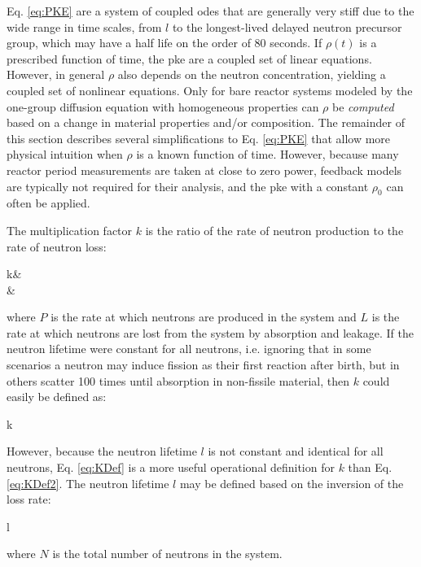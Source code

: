 Eq. \eqref{eq:PKE} are a system of coupled \glspl{ode} that are generally very stiff due to the wide range in time scales, from \(l\) to the longest-lived delayed neutron precursor group, which may have a half life on the order of 80 seconds. If \(\rho(t)\) is a prescribed function of time, the \gls{pke} are a coupled set of linear equations. However, in general \(\rho\) also depends on the neutron concentration, yielding a coupled set of nonlinear equations. Only for bare reactor systems modeled by the one-group diffusion equation with homogeneous properties can \(\rho\) be {\it computed} based on a change in material properties and/or composition. The remainder of this section describes several simplifications to Eq. \eqref{eq:PKE} that allow more physical intuition when \(\rho\) is a known function of time. However, because many reactor period measurements are taken at close to zero power, feedback models are typically not required for their analysis, and the \gls{pke} with a constant \(\rho_0\) can often be applied.

The multiplication factor \(k\) is the ratio of the rate of neutron production to the rate of neutron loss:

\beqa
\label{eq:KDef}
k\equiv&\\
\equiv&
\eeqa

where \(P\) is the rate at which neutrons are produced in the system and \(L\) is the rate at which neutrons are lost from the system by absorption and leakage. If the neutron lifetime were constant for all neutrons, i.e. ignoring that in some scenarios a neutron may induce fission as their first reaction after birth, but in others scatter 100 times until absorption in non-fissile material, then \(k\) could easily be defined as:

\beq
\label{eq:KDef2}
k\equiv{}
\eeq

However, because the neutron lifetime \(l\) is not constant and identical for all neutrons, Eq. \eqref{eq:KDef} is a more useful operational definition for \(k\) than Eq. \eqref{eq:KDef2}. The neutron lifetime \(l\) may be defined based on the inversion of the loss rate:

\beq
\label{eq:NeutronLifetime}
l\equiv{}
\eeq

where \(N\) is the total number of neutrons in the system.

